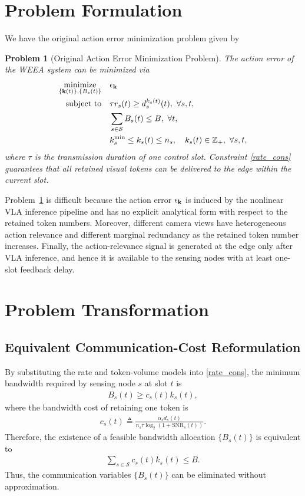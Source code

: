 \documentclass[lettersize,journal]{IEEEtran}
\theoremstyle{custom}
\newtheorem{Prob}{Problem}
\begin{document}
\section{Problem Formulation}
We have the original action error minimization problem given by
\begin{Prob}[Original Action Error Minimization Problem]\label{prob:p1}
    The action error of the WEEA system can be minimized via
    \begin{align}
        \underset{\{{\bf k}(t)\},\{B_s(t)\}}{\textrm{minimize}} \quad & \epsilon_{\bf k} \nonumber\\
        \textrm{subject to} \quad
        & \tau r_s(t) \geq d_s^{k_s(t)}(t), \ \forall s,t, \label{rate_cons}\\
        & \sum_{s\in\mathcal S}B_s(t)\leq B, \ \forall t, \nonumber\\
        & k_s^{\min}\leq k_s(t)\leq n_s,\quad k_s(t)\in\mathbb Z_+, \ \forall s,t, \nonumber
    \end{align}
    where $\tau$ is the transmission duration of one control slot. Constraint \eqref{rate_cons} guarantees that all retained visual tokens can be delivered to the edge within the current slot.
\end{Prob}

Problem~\ref{prob:p1} is difficult because the action error $\epsilon_{\bf k}$ is induced by the nonlinear VLA inference pipeline and has no explicit analytical form with respect to the retained token numbers. Moreover, different camera views have heterogeneous action relevance and different marginal redundancy as the retained token number increases. Finally, the action-relevance signal is generated at the edge only after VLA inference, and hence it is available to the sensing nodes with at least one-slot feedback delay.

\section{Problem Transformation}
\subsection{Equivalent Communication-Cost Reformulation}
By substituting the rate and token-volume models into \eqref{rate_cons}, the minimum bandwidth required by sensing node $s$ at slot $t$ is
\begin{align}
    B_s(t) \geq c_s(t) k_s(t),
\end{align}
where the bandwidth cost of retaining one token is
\begin{align}\label{eq:token_cost}
    c_s(t) \triangleq
    \frac{\alpha_s d_s(t)}{n_s\tau\log_2\!\left(1+\mathrm{SNR}_s(t)\right)}.
\end{align}
Therefore, the existence of a feasible bandwidth allocation $\{B_s(t)\}$ is equivalent to
\begin{align}\label{eq:reduced_bandwidth}
    \sum_{s\in\mathcal S}c_s(t)k_s(t)\leq B.
\end{align}
Thus, the communication variables $\{B_s(t)\}$ can be eliminated without approximation.
\end{document}

